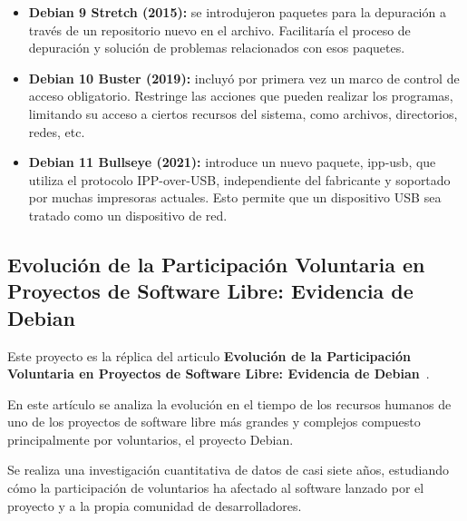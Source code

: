 \documentclass[a4paper, 12pt]{book}
\begin{document}
\begin{itemize}
	\item \textbf {Debian 9 Stretch (2015):} se introdujeron paquetes para la depuración a través de un repositorio nuevo en el archivo. Facilitaría el proceso de depuración y solución de problemas relacionados con esos paquetes.
	\item \textbf {Debian 10 Buster (2019):} incluyó por primera vez un marco de control de acceso obligatorio. Restringe las acciones que pueden realizar los programas, limitando su acceso a ciertos recursos del sistema, como archivos, directorios, redes, etc.
	\item \textbf {Debian 11 Bullseye (2021):} introduce un nuevo paquete, ipp-usb, que utiliza el protocolo IPP-over-USB, independiente del fabricante y soportado por muchas impresoras actuales. Esto permite que un dispositivo USB sea tratado como un dispositivo de red.
	
		
\end{itemize}
	
\subsection{ Evolución de la Participación Voluntaria en Proyectos de Software Libre: Evidencia de Debian}
\label{subsec:articulo debian}

Este proyecto es la réplica del articulo \textbf {Evolución de la Participación Voluntaria en Proyectos de Software Libre:
Evidencia de Debian}~\cite{robles05:_debian}.

En este 
artículo se analiza la evolución en el tiempo de los recursos humanos de 
uno de los proyectos de software libre más grandes y complejos 
compuesto principalmente por voluntarios, el proyecto Debian.

Se realiza una investigación 
cuantitativa de datos de casi siete años, estudiando cómo la participación 
de voluntarios ha afectado al software lanzado por el proyecto y a la 
propia comunidad de desarrolladores.
\end{document}

